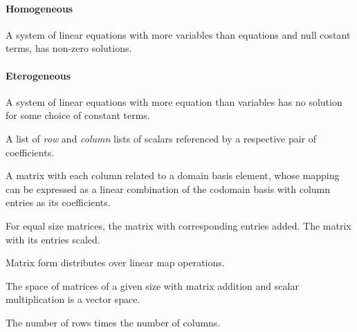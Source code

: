 \begin{multicols}{3}
  \paragraph{\textbf{Homogeneous}}
  A system of linear equations with more variables than equations and null costant terms, has non-zero solutions.
  
  \paragraph{\textbf{Eterogeneous}}
  A system of linear equations with more equation than variables has no solution for some choice of constant terms.
  
  A list of \textit{row} and \textit{column} lists of scalars referenced by a respective pair of coefficients.
  
  A matrix with each column related to a domain basis element, whose mapping can be expressed as a linear combination of the codomain basis with column entries as its coefficients.

  For equal size matrices, the matrix with corresponding entries added.
  The matrix with its entries scaled.
  
  Matrix form distributes over linear map operations.
  
  The space of matrices of a given size with matrix addition and scalar multiplication is a vector space.
  
  The number of rows times the number of columns.
  

\end{multicols}
